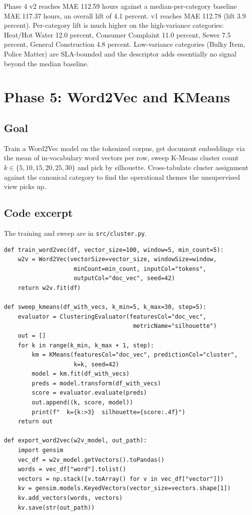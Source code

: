 \documentclass[11pt,letterpaper]{book}
\begin{document}
Phase 4 v2 reaches MAE 112.59 hours against a median-per-category baseline MAE 117.37 hours, an overall lift of 4.1 percent. v1 reaches MAE 112.78 (lift 3.9 percent). Per-category lift is much higher on the high-variance categories: Heat/Hot Water 12.0 percent, Consumer Complaint 11.0 percent, Sewer 7.5 percent, General Construction 4.8 percent. Low-variance categories (Bulky Item, Police Matter) are SLA-bounded and the descriptor adds essentially no signal beyond the median baseline.

\section{Phase 5: Word2Vec and KMeans}
\label{sec:phase5}

\subsection*{Goal}

Train a Word2Vec model on the tokenized corpus, get document embeddings via the mean of in-vocabulary word vectors per row, sweep K-Means cluster count $k \in \{5, 10, 15, 20, 25, 30\}$ and pick by silhouette. Cross-tabulate cluster assignment against the canonical category to find the operational themes the unsupervised view picks up.

\subsection*{Code excerpt}

The training and sweep are in \texttt{src/cluster.py}.

\begin{lstlisting}
def train_word2vec(df, vector_size=100, window=5, min_count=5):
    w2v = Word2Vec(vectorSize=vector_size, windowSize=window,
                    minCount=min_count, inputCol="tokens",
                    outputCol="doc_vec", seed=42)
    return w2v.fit(df)

def sweep_kmeans(df_with_vecs, k_min=5, k_max=30, step=5):
    evaluator = ClusteringEvaluator(featuresCol="doc_vec",
                                     metricName="silhouette")
    out = []
    for k in range(k_min, k_max + 1, step):
        km = KMeans(featuresCol="doc_vec", predictionCol="cluster",
                    k=k, seed=42)
        model = km.fit(df_with_vecs)
        preds = model.transform(df_with_vecs)
        score = evaluator.evaluate(preds)
        out.append((k, score, model))
        print(f"  k={k:>3}  silhouette={score:.4f}")
    return out

def export_word2vec(w2v_model, out_path):
    import gensim
    vec_df = w2v_model.getVectors().toPandas()
    words = vec_df["word"].tolist()
    vectors = np.stack([v.toArray() for v in vec_df["vector"]])
    kv = gensim.models.KeyedVectors(vector_size=vectors.shape[1])
    kv.add_vectors(words, vectors)
    kv.save(str(out_path))
\end{lstlisting}
\end{document}

